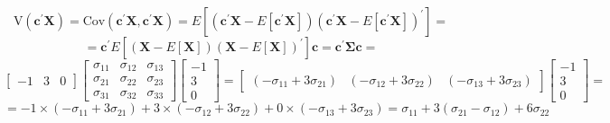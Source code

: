 \begin{enumerate}[font=\bfseries]
\begin{enumerate}
            \[
                \text{V}\left(\textbf{c}^\prime\textbf{X}\right)
                =
                \text{Cov}\left(\textbf{c}^\prime\textbf{X},\textbf{c}^\prime\textbf{X}\right)
                =
                E\left[\left(\textbf{c}^\prime\textbf{X} - E\left[\textbf{c}^\prime\textbf{X}\right]\right)\left(\textbf{c}^\prime\textbf{X} - E\left[\textbf{c}^\prime\textbf{X}\right]\right)^\prime\right]
                =
            \]
            \[
                =
                \textbf{c}^\prime E\left[\left(\textbf{X} - E\left[\textbf{X}\right]\right){\left(\textbf{X} - E\left[\textbf{X}\right]\right)}^\prime\right]\textbf{c}
                =
                \textbf{c}^\prime\mathbf{\Sigma}\textbf{c}
                =
            \]
            \[
                \begin{bmatrix}
                    -1 & 3 & 0
                \end{bmatrix}
                \begin{bmatrix}
                    \sigma_{11} & \sigma_{12} & \sigma_{13} \\
                    \sigma_{21} & \sigma_{22} & \sigma_{23} \\
                    \sigma_{31} & \sigma_{32} & \sigma_{33}
                \end{bmatrix}
                \begin{bmatrix}
                    -1 \\
                    3 \\
                    0
                \end{bmatrix}
                =
                \begin{bmatrix}
                    \left(-\sigma_{11} + 3\sigma_{21}\right) &
                    \left(-\sigma_{12} + 3\sigma_{22}\right) &
                    \left(-\sigma_{13} + 3\sigma_{23}\right)
                \end{bmatrix}
                \begin{bmatrix}
                    -1 \\
                    3 \\
                    0
                \end{bmatrix}
                =
            \]
            \[
                =
                -1 \times \left(-\sigma_{11} + 3\sigma_{21}\right) + 3 \times \left(-\sigma_{12} + 3\sigma_{22}\right)
                    + 0 \times \left(-\sigma_{13} + 3\sigma_{23}\right)
                =
                \sigma_{11} + 3(\sigma_{21} - \sigma_{12}) + 6 \sigma_{22}
\]
\end{enumerate}
\end{enumerate}
